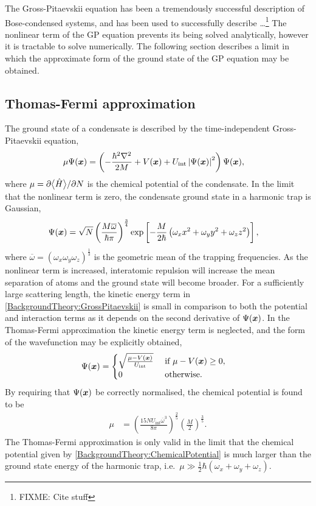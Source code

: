 \parasep

The Gross-Pitaevskii equation has been a tremendously successful description of Bose-condensed systems, and has been used to successfully describe \dots\footnote{FIXME: Cite stuff}   The nonlinear term of the GP equation prevents its being solved analytically, however it is tractable to solve numerically.  The following section describes a limit in which the approximate form of the ground state of the GP equation may be obtained.


\subsection{Thomas-Fermi approximation}

The ground state of a condensate is described by the time-independent Gross-Pitaevskii equation,
\begin{align}
    \mu \Psi(\bm{x}) &= \left(- \frac{\hbar^2 \nabla^2}{2M} + V(\bm{x}) + U_\text{int} \left|\Psi(\bm{x})\right|^2 \right) \Psi(\bm{x}),
\end{align}
where $\mu = \partial {\ensuremath{\big<\hat{H}\big>}} / \partial N$ is the chemical potential of the condensate.  In the limit that the nonlinear term is zero, the condensate ground state in a harmonic trap is Gaussian,
\begin{align}
    \Psi(\bm{x}) &= \sqrt{N} \left(\frac{M \overline{\omega}}{\hbar \pi} \right)^{\frac{3}{4}} \exp\left[ - \frac{M}{2 \hbar} \left(\omega_x x^2 + \omega_y y^2 + \omega_z z^2\right) \right],
\end{align}
where $\overline{\omega} = \left(\omega_x \omega_y \omega_z\right)^{\frac{1}{3}}$ is the geometric mean of the trapping frequencies.  As the nonlinear term is increased, interatomic repulsion will increase the mean separation of atoms and the ground state will become broader.  For a sufficiently large scattering length, the kinetic energy term in \eqref{BackgroundTheory:GrossPitaevskii} is small in comparison to both the potential and interaction terms as it depends on the second derivative of $\Psi(\bm{x})$.  In the Thomas-Fermi approximation the kinetic energy term is neglected, and the form of the wavefunction may be explicitly obtained,
\begin{align}
    \Psi(\bm{x}) &= 
    \begin{cases}
        \sqrt{\frac{\mu - V(\bm{x})}{U_\text{int}}} &\text{ if } \mu - V(\bm{x}) \geq 0,\\
        0 & \text{ otherwise.}
    \end{cases}
\end{align}
By requiring that $\Psi(\bm{x})$ be correctly normalised, the chemical potential is found to be
\begin{align}
    \mu &= \left(\frac{15 N U_\text{int} \overline{\omega}^3}{8 \pi} \right)^{\frac{2}{5}} \left(\frac{M}{2} \right)^{\frac{3}{5}}. \label{BackgroundTheory:ChemicalPotential}
\end{align}
The Thomas-Fermi approximation is only valid in the limit that the chemical potential given by \eqref{BackgroundTheory:ChemicalPotential} is much larger than the ground state energy of the harmonic trap, i.e.\ $\mu \gg \frac{1}{2} \hbar (\omega_x + \omega_y + \omega_z)$.

